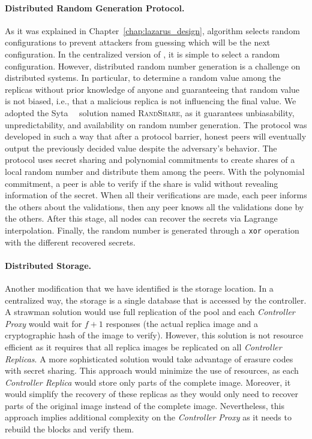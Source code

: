 \paragraph{Distributed Random Generation Protocol.}
As it was explained in Chapter~\ref{chap:lazarus_design}, \system algorithm selects random configurations to prevent attackers from guessing which will be the next configuration.
In the centralized version of \system, it is simple to select a random configuration.
However, distributed random number generation is a challenge on distributed systems.
In particular, to determine a random value among the replicas without prior knowledge of anyone and guaranteeing that random value is not biased, i.e., that a malicious replica is not influencing the final value.
We adopted the Syta~\etal{}~\cite{Syta:2017} solution named \textsc{RandShare}, as it guarantees unbiasability, unpredictability, and availability on random number generation.
The protocol was developed in such a way that after a protocol barrier, honest peers will eventually output the previously decided value despite the adversary's behavior.
The protocol uses secret sharing and polynomial commitments to create shares of a local random number and distribute them among the peers.
With the polynomial commitment, a peer is able to verify if the share is valid without revealing information of the secret.
When all their verifications are made, each peer informs the others about the validations, then any peer knows all the validations done by the others.
After this stage, all nodes can recover the secrets via Lagrange interpolation.
Finally, the random number is generated through a \texttt{xor} operation with the different recovered secrets.


\paragraph{Distributed Storage.}
Another modification that we have identified is the storage location. 
In a centralized way, the storage is a single database that is accessed by the controller.
A strawman solution would use full replication of the pool and each \emph{Controller Proxy} would wait for $f+1$ responses (the actual replica image and a cryptographic hash of the image to verify).
However, this solution is not resource efficient as it requires that all replica images be replicated on all \emph{Controller Replicas}.
A more sophisticated solution would take advantage of erasure codes with secret sharing.
This approach would minimize the use of resources, as each \emph{Controller Replica} would store only parts of the complete image.
Moreover, it would simplify the recovery of these replicas as they would only need to recover parts of the original image instead of the complete image.
Nevertheless, this approach implies additional complexity on the \emph{Controller Proxy} as it needs to rebuild the blocks and verify them.


